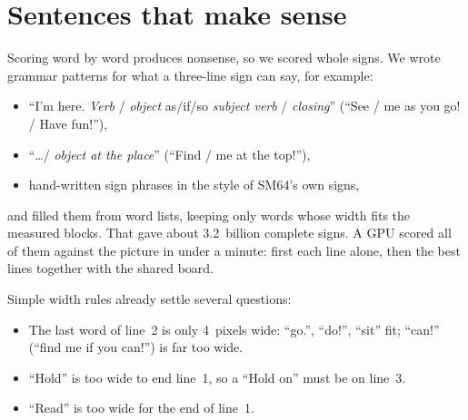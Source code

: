 \documentclass[10pt,a4paper]{article}
\newcommand{\q}[1]{``#1''}
\begin{document}
\section{Sentences that make sense}
\label{sec:sentences}
Scoring word by word produces nonsense, so we scored whole signs. We wrote grammar patterns for what a three-line sign
can say, for example:
\begin{itemize}
\item \q{I'm here. \emph{Verb} / \emph{object} as/if/so \emph{subject verb} / \emph{closing}} (\q{See / me as you go! / Have fun!}),
\item \q{\ldots / \emph{object at the place}} (\q{Find / me at the top!}),
\item hand-written sign phrases in the style of SM64's own signs,
\end{itemize}
and filled them from word lists, keeping only words whose width fits the measured blocks. That gave about 3.2~billion
complete signs. A GPU scored all of them against the picture in under a minute: first each line alone, then the best
lines together with the shared board.

Simple width rules already settle several questions:
\begin{itemize}
\item The last word of line~2 is only 4~pixels wide: \q{go.}, \q{do!}, \q{sit} fit; \q{can!} (\q{find me if you
can!}) is far too wide.
\item \q{Hold} is too wide to end line~1, so a \q{Hold on} must be on line~3.
\item \q{Read} is too wide for the end of line~1.
\end{itemize}
\end{document}
